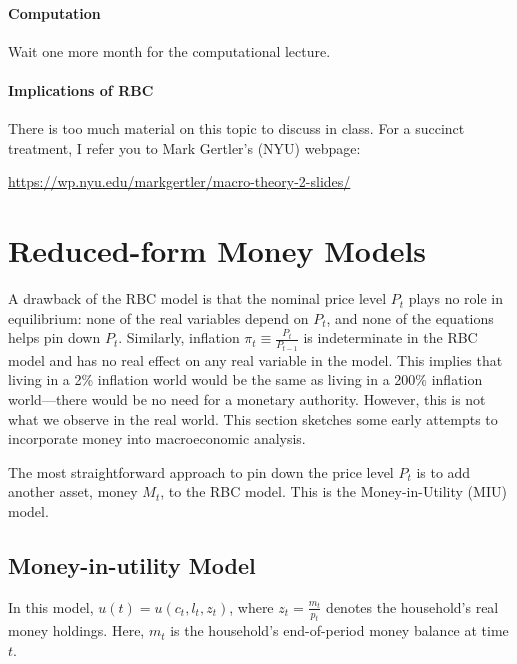 \documentclass[12pt]{article}
\begin{document}

\paragraph{Computation} Wait one more month for the computational lecture.

\paragraph{Implications of RBC} There is too much material on this topic to discuss in class. For a succinct treatment, I refer you to Mark Gertler's (NYU) webpage:
\begin{center}
	\url{https://wp.nyu.edu/markgertler/macro-theory-2-slides/}
\end{center}

\section{Reduced-form Money Models}

A drawback of the RBC model is that the nominal price level $P_t$ plays no role in equilibrium: none of the real variables depend on $P_t$, and none of the equations helps pin down $P_t$. Similarly, inflation $\pi_{t} \equiv \frac{P_{t}}{P_{t-1}}$ is indeterminate in the RBC model and has no real effect on any real variable in the model. This implies that living in a 2\% inflation world would be the same as living in a 200\% inflation world---there would be no need for a monetary authority. However, this is not what we observe in the real world. This section sketches some early attempts to incorporate money into macroeconomic analysis.

The most straightforward approach to pin down the price level $P_t$ is to add another asset, money $M_t$, to the RBC model. This is the Money-in-Utility (MIU) model.

\subsection{Money-in-utility Model}
In this model, $u(t) = u(c_t, l_t, z_t)$, where $z_t = \frac{m_t}{p_t}$ denotes the household's real money holdings. Here, $m_t$ is the household's end-of-period money balance at time $t$.
\end{document}
